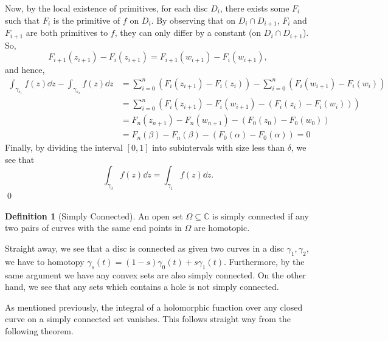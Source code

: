 \documentclass[
]{article}
\theoremstyle{definition}
\theoremstyle{definition}
\newtheorem{definition}{Definition}[section]
\begin{document}
\begin{center}

\end{center}

Now, by the local existence of primitives, for each disc \(D_i\), there
exists some \(F_i\) such that \(F_i\) is the primitive of \(f\) on
\(D_i\). By observing that on \(D_i \cap D_{i + 1}\), \(F_i\) and
\(F_{i + 1}\) are both primitives to \(f\), they can only differ by a
constant (on \(D_i \cap D_{i + 1}\)). So,
\[F_{i + 1}(z_{i + 1}) - F_i(z_{i + 1}) = F_{i + 1}(w_{i + 1}) - F_i(w_{i + 1}),\]
and hence, \[\begin{split}
    \int_{\gamma_{s_1}}f(z) \dd z - \int_{\gamma_{s_2}} f(z) \dd z & = 
      \sum_{i = 0}^{n}(F_i(z_{i + 1}) - F_i(z_i)) - \sum_{i = 0}^n(F_i(w_{i + 1}) - F_i(w_i))\\
      & = \sum_{i = 0}^n(F_i(z_{i + 1}) - F_i(w_{i + 1}) - (F_i(z_i) - F_i(w_i)))\\
      & = F_n(z_{n + 1}) - F_n(w_{n + 1}) - (F_0(z_0) - F_0(w_0))\\
      & = F_n(\beta) - F_n(\beta) - (F_0(\alpha) - F_0(\alpha)) = 0
  \end{split}\] Finally, by dividing the interval \([0, 1]\) into
subintervals with size less than \(\delta\), we see that
\[\int_{\gamma_0} f(z) \dd z = \int_{\gamma_1} f(z) \dd z.\] \qed

\begin{definition}[Simply Connected]
  An open set \(\Omega \subseteq \mathbb{C}\) is simply connected if any two pairs 
  of curves with the same end points in \(\Omega\) are homotopic.
\end{definition}

Straight away, we see that a disc is connected as given two curves in a
disc \(\gamma_1, \gamma_2\), we have to homotopy
\(\gamma_s(t) = (1- s)\gamma_0(t) + s\gamma_1(t)\). Furthermore, by the
same argument we have any convex sets are also simply connected. On the
other hand, we see that any sets which contains a hole is not simply
connected.

As mentioned previously, the integral of a holomorphic function over any
closed curve on a simply connected set vanishes. This follows straight
way from the following theorem.
\end{document}
